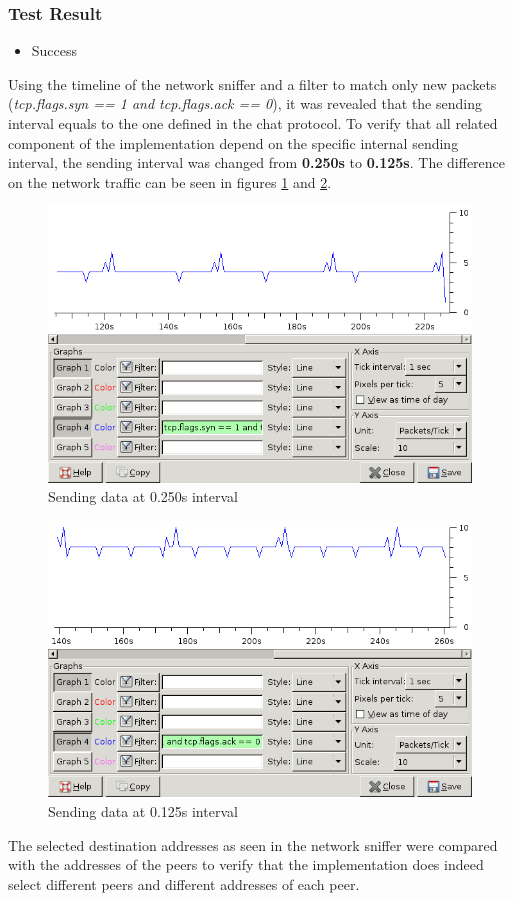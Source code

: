 \subsubsection{Test Result}
\begin{itemize}
\item Success
\end{itemize}
Using the timeline of the network sniffer and a filter
to match only new packets
(\textit{tcp.flags.syn == 1 and tcp.flags.ack == 0}),
it was revealed that the sending interval equals to
the one defined in the chat protocol. 
To verify that all related component of the
implementation depend on the specific internal sending
interval, the sending interval was changed from 
\textbf{0.250s} to \textbf{0.125s}. 
The difference on the network traffic can be seen in figures
\ref{sending0250} and \ref{sending0125}.
\begin{figure}[tbp]
\caption{Sending data at 0.250s interval}
\label{sending0250}
\centering
\includegraphics[scale=0.5]{noise-at-0250s.png}
\end{figure}
\begin{figure}[htbp]
\caption{Sending data at 0.125s interval}
\label{sending0125}
\centering
\includegraphics[scale=0.5]{noise-at-0125s.png}
\end{figure}
The selected destination addresses as seen in the network
sniffer were compared with the addresses of the peers to verify
that the implementation does indeed select different peers
and different addresses of each peer.
